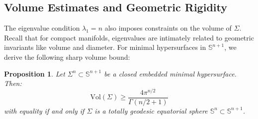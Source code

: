\documentclass[a4, 12pt]{amsart}
\numberwithin{equation}{section} \numberwithin{equation}{section}
\newtheorem{prop}[thm]{Proposition}
\begin{document}
\subsection{Volume Estimates and Geometric Rigidity}

The eigenvalue condition $\lambda_1 = n$ also imposes constraints on the volume of $\Sigma$. Recall that for compact manifolds, eigenvalues are intimately related to geometric invariants like volume and diameter. For minimal hypersurfaces in $\mathbb{S}^{n+1}$, we derive the following sharp volume bound:

\begin{prop}\label{volume-estimate}
Let $\Sigma^n \subset \mathbb{S}^{n+1}$ be a closed embedded minimal hypersurface. Then:
\begin{equation*}
\text{Vol}(\Sigma) \geq \frac{4\pi^{n/2}}{\Gamma(n/2 + 1)}
\end{equation*}
with equality if and only if $\Sigma$ is a totally geodesic equatorial sphere $\mathbb{S}^n \subset \mathbb{S}^{n+1}$.
\end{prop}
\end{document}
